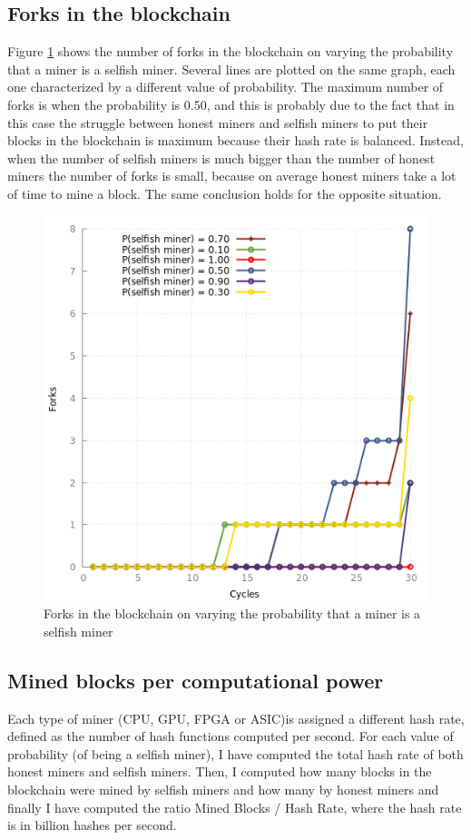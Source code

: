 \documentclass{article}
\begin{document}
\subsection{Forks in the blockchain}
Figure \ref{fig:forks} shows the number of forks in the blockchain on varying the probability that a miner is a selfish miner. Several lines are plotted on the same graph, each one characterized by a different value of probability. The maximum number of forks is when the probability is 0.50, and this is probably due to the fact that in this case the struggle between honest miners and selfish miners to put their blocks in the blockchain is maximum because their hash rate is balanced. Instead, when the number of selfish miners is much bigger than the number of honest miners the number of forks is small, because on average honest miners take a lot of time to mine a block. The same conclusion holds for the opposite situation.
\begin{figure}
\centerline{\includegraphics[scale=0.50]{plots/forks}}
\caption{Forks in the blockchain on varying the probability that a miner is a selfish miner}
\label{fig:forks}
\end{figure}

\subsection{Mined blocks per computational power}
Each type of miner (CPU, GPU, FPGA or ASIC)is assigned a different hash rate, defined as the number of hash functions computed per second. For each value of probability (of being a selfish miner), I have computed the total hash rate of both honest miners and selfish miners. Then, I computed how many blocks in the blockchain were mined by selfish miners and how many by honest miners and finally I have computed the ratio Mined Blocks / Hash Rate, where the hash rate is in billion hashes per second.
\end{document}
